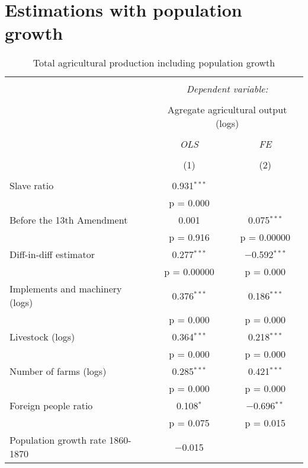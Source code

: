 \documentclass[12pt]{report}
\begin{document}
\newpage

\section*{Estimations with population growth}


\begin{table}[!htbp] \centering 
  \caption{Total agricultural production including population growth} 
  \label{tab:agout} 
\begin{tabular}{@{\extracolsep{5pt}}lcc} 
\\[-1.8ex]\hline 
\hline \\[-1.8ex] 
 & \multicolumn{2}{c}{\textit{Dependent variable:}} \\ 
\cline{2-3} 
\\[-1.8ex] & \multicolumn{2}{c}{Agregate agricultural output (logs)} \\ 
\\[-1.8ex] & \textit{OLS} & \textit{FE} \\ 
\\[-1.8ex] & (1) & (2)\\ 
\hline \\[-1.8ex] 
 Slave ratio & 0.931$^{***}$ &  \\ 
  & p = 0.000 &  \\ 
  Before the 13th Amendment & 0.001 & 0.075$^{***}$ \\ 
  & p = 0.916 & p = 0.00000 \\ 
  Diff-in-diff estimator & 0.277$^{***}$ & $-$0.592$^{***}$ \\ 
  & p = 0.00000 & p = 0.000 \\ 
  Implements and machinery (logs) & 0.376$^{***}$ & 0.186$^{***}$ \\ 
  & p = 0.000 & p = 0.000 \\ 
  Livestock (logs) & 0.364$^{***}$ & 0.218$^{***}$ \\ 
  & p = 0.000 & p = 0.000 \\ 
  Number of farms (logs) & 0.285$^{***}$ & 0.421$^{***}$ \\ 
  & p = 0.000 & p = 0.000 \\ 
  Foreign people ratio & 0.108$^{*}$ & $-$0.696$^{**}$ \\ 
  & p = 0.075 & p = 0.015 \\ 
  Population growth rate 1860-1870 & $-$0.015 &  \\ 

\end{tabular}
\end{table}
\end{document}
